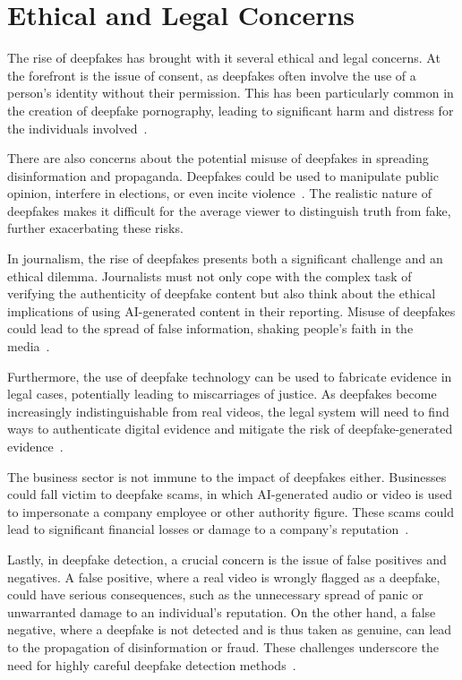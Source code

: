 \section{Ethical and Legal Concerns}\label{chapter:legal}
The rise of deepfakes has brought with it several ethical and legal concerns.
At the forefront is the issue of consent, as deepfakes often involve the
use of a person's identity without their permission. This has been
particularly common in the creation of deepfake pornography, leading
to significant harm and distress for the individuals involved~\cite{chesney2019deep}.

There are also concerns about the potential misuse of deepfakes in spreading
disinformation and propaganda. Deepfakes could be used to manipulate public
opinion, interfere in elections, or even incite violence~\cite{deepfakes-business-insider,partnershiponai}.
The realistic nature of deepfakes makes it difficult for the average viewer
to distinguish truth from fake, further exacerbating these risks.

In journalism, the rise of deepfakes presents both a significant
challenge and an ethical dilemma. Journalists must not only cope with
the complex task of verifying the authenticity of deepfake content
but also think about the ethical implications of using \ac{AI}-generated
content in their reporting. Misuse of deepfakes could lead to the spread of
false information, shaking people's faith in the media~\cite{doi:10.1177/2056305120903408}.

Furthermore, the use of deepfake technology can be used to fabricate evidence in
legal cases, potentially leading to miscarriages of justice. As deepfakes become
increasingly indistinguishable from real videos, the legal system will need to
find ways to authenticate digital evidence and mitigate the risk of deepfake-generated
evidence~\cite{chesney2019deep}.

The business sector is not immune to the impact of deepfakes either. Businesses
could fall victim to deepfake scams, in which \ac{AI}-generated audio or video
is used to impersonate a company employee or other authority figure.
These scams could lead to significant financial losses or damage to a
company's reputation~\cite{MUSTAK2023113368}.

Lastly, in deepfake detection, a crucial concern is the issue of
false positives and negatives. A false positive, where a real video is wrongly
flagged as a deepfake, could have serious consequences, such as the unnecessary
spread of panic or unwarranted damage to an individual's reputation. On the
other hand, a false negative, where a deepfake is not detected and is thus
taken as genuine, can lead to the propagation of disinformation or fraud.
These challenges underscore the need for highly careful deepfake detection methods~\cite{roessler2019faceforensicspp}.

